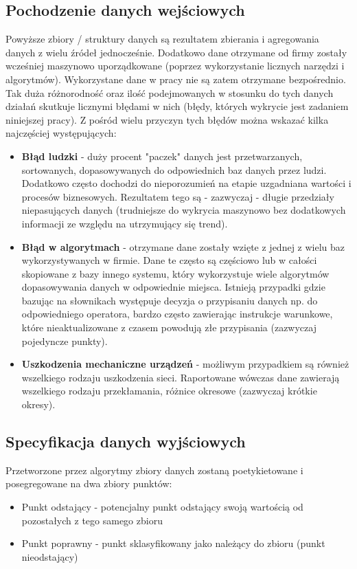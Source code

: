 \documentclass[eng,printmode]{mgr}
\begin{document}
\subsection{Pochodzenie danych wejściowych}
Powyższe zbiory / struktury danych są rezultatem zbierania i agregowania danych z wielu źródeł jednocześnie. Dodatkowo dane otrzymane od firmy zostały wcześniej maszynowo uporządkowane (poprzez wykorzystanie licznych narzędzi i algorytmów). Wykorzystane dane w pracy nie są zatem otrzymane bezpośrednio. Tak duża różnorodność oraz ilość podejmowanych w stosunku do tych danych działań skutkuje licznymi błędami w nich (błędy, których wykrycie jest zadaniem niniejszej pracy). Z pośród wielu przyczyn tych błędów można wskazać kilka najczęściej występujących:
\begin{itemize}
\item \textbf{Błąd ludzki} - duży procent "paczek" danych jest przetwarzanych, sortowanych, dopasowywanych do odpowiednich baz danych przez ludzi. Dodatkowo często dochodzi do nieporozumień na etapie uzgadniana wartości i procesów biznesowych. Rezultatem tego są - zazwyczaj - długie przedziały niepasujących danych (trudniejsze do wykrycia maszynowo bez dodatkowych informacji ze względu na utrzymujący się trend).
\item \textbf{Błąd w algorytmach} - otrzymane dane zostały wzięte z jednej z wielu baz wykorzystywanych w firmie. Dane te często są częściowo lub w całości skopiowane z bazy innego systemu, który wykorzystuje wiele algorytmów dopasowywania danych w odpowiednie miejsca. Istnieją przypadki gdzie bazując na słownikach występuje decyzja o przypisaniu danych np. do odpowiedniego operatora, bardzo często zawierając instrukcje warunkowe, które nieaktualizowane z czasem powodują złe przypisania (zazwyczaj pojedyncze punkty).
\item \textbf{Uszkodzenia mechaniczne urządzeń} - możliwym przypadkiem są również wszelkiego rodzaju uszkodzenia sieci. Raportowane wówczas dane zawierają wszelkiego rodzaju przekłamania, różnice okresowe (zazwyczaj krótkie okresy).
\end{itemize}
\subsection{Specyfikacja danych wyjściowych}
Przetworzone przez algorytmy zbiory danych zostaną poetykietowane i posegregowane na dwa zbiory punktów:
\begin{itemize}
\item Punkt odstający - potencjalny punkt odstający swoją wartością od pozostałych z tego samego zbioru
\item Punkt poprawny - punkt sklasyfikowany jako należący do zbioru (punkt nieodstający)
\end{itemize}
\end{document}

